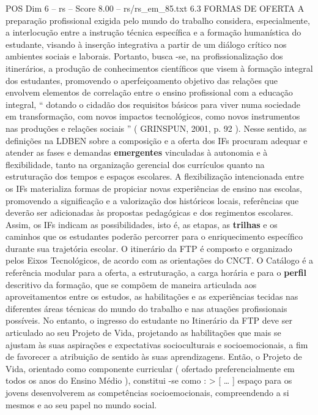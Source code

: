 \begin{textsample}{POS Dim 6 – rs – Score 8.00 – rs/rs\_em\_85.txt}  \label{ex:f6_pos_187}
6.3 FORMAS DE OFERTA A preparação profissional exigida pelo mundo do trabalho considera, especialmente, a interlocução entre a instrução técnica específica e a formação humanística do estudante, visando à inserção integrativa a partir de um diálogo crítico nos ambientes sociais e laborais.
Portanto, busca -se, na profissionalização dos itinerários, a produção de conhecimentos científicos que visem à formação integral dos estudantes, promovendo o aperfeiçoamento objetivo das relações que envolvem elementos de correlação entre o ensino profissional com a educação integral, “ dotando o cidadão dos requisitos básicos para viver numa sociedade em transformação, com novos impactos tecnológicos, como novos instrumentos nas produções e relações sociais ” ( GRINSPUN, 2001, p. 92 ).
Nesse sentido, as definições na LDBEN sobre a composição e a oferta dos IFs procuram adequar e atender as fases e demandas \textbf{emergentes} vinculadas à autonomia e à flexibilidade, tanto na organização gerencial dos currículos quanto na estruturação dos tempos e espaços escolares.
A flexibilização intencionada entre os IFs materializa formas de propiciar novas experiências de ensino nas escolas, promovendo a significação e a valorização dos históricos locais, referências que deverão ser adicionadas às propostas pedagógicas e dos regimentos escolares.
Assim, os IFs indicam as possibilidades, isto é, as etapas, as \textbf{trilhas} e os caminhos que os estudantes poderão percorrer para o enriquecimento específico durante sua trajetória escolar.
O itinerário da FTP é composto e organizado pelos Eixos Tecnológicos, de acordo com as orientações do CNCT.
O Catálogo é a referência modular para a oferta, a estruturação, a carga horária e para o \textbf{perfil} descritivo da formação, que se compõem de maneira articulada aos aproveitamentos entre os estudos, as habilitações e as experiências tecidas nas diferentes áreas técnicas do mundo do trabalho e nas atuações profissionais possíveis.
No entanto, o ingresso do estudante no Itinerário da FTP deve ser articulado ao seu Projeto de Vida, projetando as habilitações que mais se ajustam às suas aspirações e expectativas socioculturais e socioemocionais, a fim de favorecer a atribuição de sentido às suas aprendizagens.
Então, o Projeto de Vida, orientado como componente curricular ( ofertado preferencialmente em todos os anos do Ensino Médio ), constitui -se como : > [ … ] espaço para os jovens desenvolverem as competências socioemocionais, compreendendo a si mesmos e ao seu papel no mundo social.

\end{textsample}
